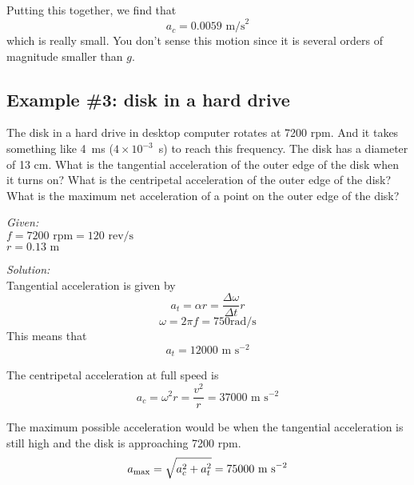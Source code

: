 Putting this together, we find that
$$a_c = 0.0059\mbox{ m/s}^2$$
which is really small. You don't sense this motion since it is several orders of magnitude smaller than $g$.


\subsection{Example \#3: disk in a hard drive}
The disk in a hard drive in desktop computer rotates at 7200 rpm. And it takes something like 4~ms ($4\times 10^{-3}$~s) to reach this frequency. The disk has a diameter of 13 cm. What is the tangential acceleration of the outer edge of the disk when it turns on? What is the centripetal acceleration of the outer edge of the disk? What is the maximum net acceleration of a point on the outer edge of the disk?

\textit{Given:}\\
$f=7200\mbox{ rpm}=120\mbox{ rev/s}$\\
$r=0.13\mbox{ m}$

\textit{Solution:}\\
Tangential acceleration is given by
$$a_t = \alpha r = \frac{\Delta \omega}{\Delta t}r$$
$$\omega=2\pi f=750\mbox{rad/s}$$
This means that
$$a_t = 12000\mbox{ m s}^{-2}$$

The centripetal acceleration at full speed is
$$a_c = \omega^2r = \frac{v^2}{r} = 37000\mbox{ m s}^{-2}$$

The maximum possible acceleration would be when the tangential acceleration is still high and the disk is approaching 7200 rpm.
$$a_{\rm max} = \sqrt{a_c^2+a_t^2} = 75000\mbox{ m s}^{-2}$$






